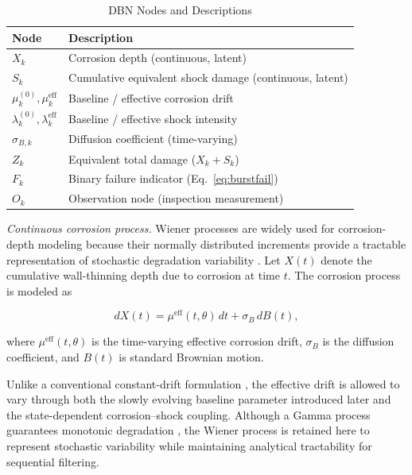 \documentclass[journal]{IEEEtran}
\begin{document}
\begin{table}[!ht]
\centering
\caption{DBN Nodes and Descriptions}
\label{tab:dbnnodes}
\begin{tabular}{ll}
\toprule
Node & Description \\
\midrule
$X_k$ & Corrosion depth (continuous, latent) \\
$S_k$ & Cumulative equivalent shock damage (continuous, latent) \\
$\mu_k^{(0)},\mu_k^{\mathrm{eff}}$
& Baseline / effective corrosion drift \\
$\lambda_k^{(0)},\lambda_k^{\mathrm{eff}}$
& Baseline / effective shock intensity \\
$\sigma_{B,k}$ & Diffusion coefficient (time-varying) \\
$Z_k$ & Equivalent total damage ($X_k+S_k$) \\
$F_k$ & Binary failure indicator (Eq.~\eqref{eq:burstfail}) \\
$O_k$ & Observation node (inspection measurement) \\
\bottomrule
\end{tabular}
\end{table}



\textit{Continuous corrosion process.}
Wiener processes are widely used for corrosion-depth modeling because
their normally distributed increments provide a tractable
representation of stochastic degradation variability
\cite{zhang2018}. Let $X(t)$ denote the cumulative wall-thinning depth
due to corrosion at time $t$. The corrosion process is modeled as

\begin{equation}
dX(t) = \mu^{\mathrm{eff}}(t,\theta)\,dt
      + \sigma_B\,dB(t),
\label{eq:wiener}
\end{equation}

where $\mu^{\mathrm{eff}}(t,\theta)$ is the time-varying effective
corrosion drift, $\sigma_B$ is the diffusion coefficient, and $B(t)$
is standard Brownian motion.

Unlike a conventional constant-drift formulation
\cite{zhang2018}, the effective drift is allowed to vary through both
the slowly evolving baseline parameter introduced later and the
state-dependent corrosion--shock coupling. Although a Gamma process
guarantees monotonic degradation \cite{ling2015}, the Wiener process
is retained here to represent stochastic variability while maintaining
analytical tractability for sequential filtering.
\end{document}
